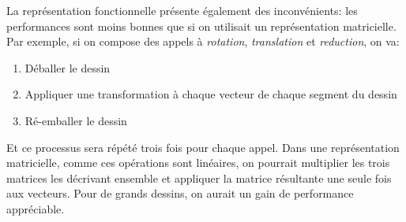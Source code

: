 \documentclass[10pt]{article}
\begin{document}
La représentation fonctionnelle présente également des inconvénients:
les performances sont moins bonnes que si on utilisait un
représentation matricielle.  Par exemple, si on compose des appels à
\emph{rotation}, \emph{translation} et \emph{reduction}, on va:

\begin{enumerate}
\item Déballer le dessin
\item Appliquer une transformation à chaque vecteur de chaque segment
  du dessin
\item Ré-emballer le dessin
\end{enumerate}

Et ce processus sera répété trois fois pour chaque appel.  Dans une
représentation matricielle, comme ces opérations sont linéaires, on
pourrait multiplier les trois matrices les décrivant ensemble et
appliquer la matrice résultante une seule fois aux vecteurs.  Pour de
grands dessins, on aurait un gain de performance appréciable.
\end{document}
